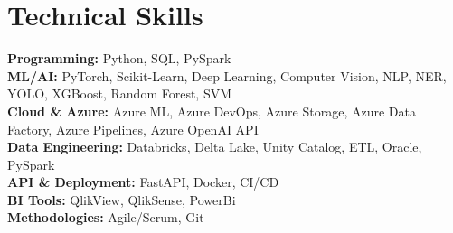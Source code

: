 \documentclass{ExpressiveResume}
\begin{document}
\section{Technical Skills}
\noindent \textbf{Programming:} Python, SQL, PySpark \\
\textbf{ML/AI:} PyTorch, Scikit-Learn, Deep Learning, Computer Vision, NLP, NER, YOLO, XGBoost, Random Forest, SVM \\
\textbf{Cloud \& Azure:} Azure ML, Azure DevOps, Azure Storage, Azure Data Factory, Azure Pipelines, Azure OpenAI API \\
\textbf{Data Engineering:} Databricks, Delta Lake, Unity Catalog, ETL, Oracle, PySpark \\
\textbf{API \& Deployment:} FastAPI, Docker, CI/CD \\
\textbf{BI Tools:} QlikView, QlikSense, PowerBi \\
\textbf{Methodologies:} Agile/Scrum, Git
\end{document}

